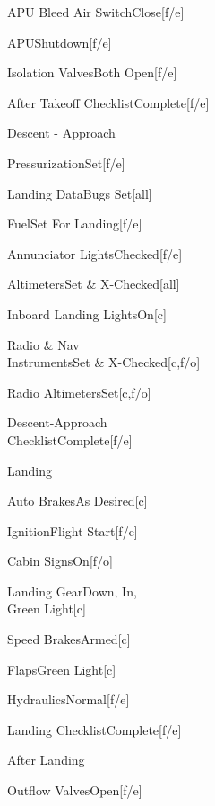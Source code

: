 \documentclass[sim-use, blue_items, halfpage]{checklist}
\begin{document}
\begin{continuedchecklist}
	 {
		\item{APU Bleed Air Switch}{Close}[f/e]
		\item{APU}{Shutdown}[f/e]
		\item{Isolation Valves}{Both Open}[f/e]
	}
	\item{After Takeoff Checklist}{Complete}[f/e]
\end{continuedchecklist}

\begin{checklist}{Descent - Approach}
	\item{Pressurization}{Set}[f/e]
	\item{Landing Data}{Bugs Set}[all]
	\item{Fuel}{Set For Landing}[f/e]
	\item{Annunciator Lights}{Checked}[f/e]
	\item{Altimeters}{Set \& X-Checked}[all]
	\item{Inboard Landing Lights}{On}[c]
	\item{Radio \& Nav\\Instruments}{Set \& X-Checked}[c,f/o]
	\item{Radio Altimeters}{Set}[c,f/o]
	\item{Descent-Approach\\Checklist}{Complete}[f/e]
\end{checklist}

\begin{checklist}{Landing}
	\item{Auto Brakes}{As Desired}[c]
	\item{Ignition}{Flight Start}[f/e]
	\item{Cabin Signs}{On}[f/o]
	\item{Landing Gear}{Down, In,\\Green Light}[c]
	\item{Speed Brakes}{Armed}[c]
	\item{Flaps}{\blank \blank Green Light}[c]
	\item{Hydraulics}{Normal}[f/e]
	\item{Landing Checklist}{Complete}[f/e]
\end{checklist}

\begin{checklist}{After Landing}
	\item{Outflow Valves}{Open}[f/e]
\end{checklist}
\end{document}
